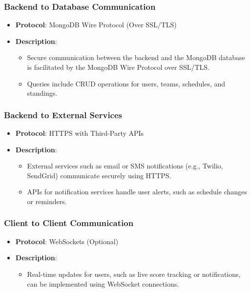 \documentclass[12pt, titlepage]{article}
\begin{document}
\subsubsection*{Backend to Database Communication}
\begin{itemize}
  \item \textbf{Protocol}: MongoDB Wire Protocol (Over SSL/TLS)
  \item \textbf{Description}:
        \begin{itemize}
          \item Secure communication between the backend and the MongoDB database is facilitated by the MongoDB Wire Protocol over SSL/TLS.
          \item Queries include CRUD operations for users, teams, schedules, and standings.
        \end{itemize}
\end{itemize}

\subsubsection*{Backend to External Services}
\begin{itemize}
  \item \textbf{Protocol}: HTTPS with Third-Party APIs
  \item \textbf{Description}:
        \begin{itemize}
          \item External services such as email or SMS notifications (e.g., Twilio, SendGrid) communicate securely using HTTPS.
          \item APIs for notification services handle user alerts, such as schedule changes or reminders.
        \end{itemize}
\end{itemize}

\subsubsection*{Client to Client Communication}
\begin{itemize}
  \item \textbf{Protocol}: WebSockets (Optional)
  \item \textbf{Description}:
        \begin{itemize}
          \item Real-time updates for users, such as live score tracking or notifications, can be implemented using WebSocket connections.
        \end{itemize}
\end{itemize}
\end{document}
